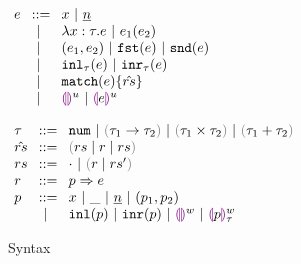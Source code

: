 
\begin{figure}[ht]
    \centering
    \begin{minipage}{.5\linewidth}
  $\arraycolsep=4pt\begin{array}{lll}
    e & ::= &
      x ~\vert~
      \hnum{n} \\
      & ~\vert~ &
      \hlam{x}{\tau}{e} ~\vert~
      \hap{e_1}{e_2} \\
      & ~\vert~ &
      \hpair{e_1}{e_2} ~\vert~
      \hfst{e} ~\vert~ \hsnd{e} \\
      & ~\vert~ &
      \hinl{\tau}{e} ~\vert~
      \hinr{\tau}{e} \\
      & ~\vert~ &
      \hmatch{e}{\hat{rs}} \\
      & ~\vert~ &
      \hehole{u} ~\vert~
      \hhole{e}{u} \\
    \end{array}$
    \end{minipage}%
    \begin{minipage}{.5\linewidth}
  $\arraycolsep=4pt\begin{array}{lll}
    \tau & ::= &
      \tnum ~\vert~
      \tarr{\tau_1}{\tau_2} ~\vert~
      \tprod{\tau_1}{\tau_2} ~\vert~
      \tsum{\tau_1}{\tau_2} \\
    \hat{rs} & ::= &
      \zrulsP{rs}{r}{rs} \\
    rs & ::= &
      \cdot ~\vert~ \hrulesP{r}{rs'} \\
    r & ::= &
      \hrul{p}{e} \\
    p & ::= &
      x ~\vert~
      \_ ~\vert~
      \hnum{n} ~\vert~
      \hpair{p_1}{p_2} \\
      & ~\vert~ &
      \hinlp{p} ~\vert~
      \hinrp{p} ~\vert~
      \heholep{w} ~\vert~
      \hholep{p}{w}{\tau}
    \end{array}$
    \end{minipage}
\caption{Syntax}
\label{fig:syntax}
\end{figure}